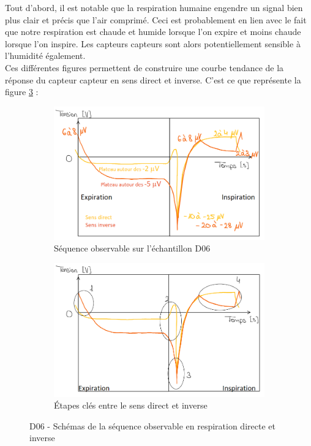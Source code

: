 Tout d'abord, il est notable que la respiration humaine engendre un signal bien plus clair et précis que l'air comprimé. Ceci est probablement 
en lien avec le fait que notre respiration est chaude et humide lorsque l'on expire et moins chaude lorsque l'on inspire. Les capteurs \gls{capteur}s
sont alors potentiellement sensible à l'humidité également. \\

Ces différentes figures permettent de construire une courbe tendance de la réponse du capteur \gls{capteur} en sens direct et inverse. C'est ce que représente 
la figure \ref{fig:schemas_tendance} :\\
\begin{figure}[H]
    \hspace{-1.5cm}
    \begin{subfigure}{0.45\textwidth}
        \includegraphics[scale = 0.5]{assets/figures/D06_courbe_tendance.png}
        \caption{Séquence observable sur l'échantillon D06}
        \label{fig:courbe_tendance}
    \end{subfigure}
    \hspace{2cm}
    \begin{subfigure}{0.48\textwidth}
        \includegraphics[scale = 0.5]{assets/figures/D06_courbe_tendance_diff.png}
        \caption{Étapes clés entre le sens direct et inverse}
        \label{fig:tendance_2}
    \end{subfigure}
    \caption{D06 - Schémas de la séquence observable en respiration directe et inverse}
    \label{fig:schemas_tendance}
\end{figure}


